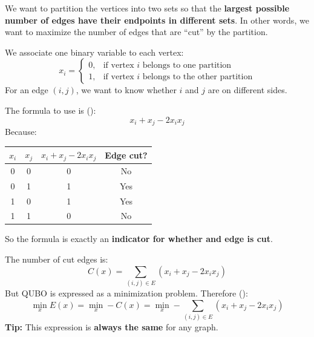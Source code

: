 \highspace
\begin{deepeningbox}
    We want to partition the vertices into two sets so that the \textbf{largest possible number of edges have their endpoints in different sets}. In other words, we want to maximize the number of edges that are ``cut'' by the partition.

    \highspace
    We associate one binary variable to each vertex:
    \begin{equation*}
        x_i =
        \begin{cases}
            0, & \text{if vertex $i$ belongs to one partition} \\
            1, & \text{if vertex $i$ belongs to the other partition}
        \end{cases}
    \end{equation*}
    For an edge $(i,j)$, we want to know whether $i$ and $j$ are on different sides.

    \highspace
    The formula to use is ():
    \begin{equation*}
        x_i + x_j - 2 x_i x_j
    \end{equation*}
    Because:
    \begin{center}
        \begin{tabular}{@{} c c c c @{}}
            \toprule
            $x_i$ & $x_j$ & $x_i + x_j - 2 x_i x_j$ & \textbf{Edge cut?} \\
            \midrule
            0 & 0 & 0 & No \\
            0 & 1 & 1 & Yes \\
            1 & 0 & 1 & Yes \\
            1 & 1 & 0 & No \\
            \bottomrule
        \end{tabular}
    \end{center}
    So the formula is exactly an \textbf{indicator for whether and edge is cut}.
\end{deepeningbox}

\highspace
{} The number of cut edges is:
\begin{equation*}
    C(x) = \sum_{(i, j) \in E} \left(x_i + x_j - 2 x_i x_j\right)
\end{equation*}
But QUBO is expressed as a minimization problem. Therefore ():
\begin{equation*}
    \boxed{\min_{x} E(x) = \min_{x} -C(x) = \min_{x} - \sum_{(i, j) \in E} \left(x_i + x_j - 2 x_i x_j\right)}
\end{equation*}
\textcolor{Green3}{ \textbf{Tip:}} This expression is \textbf{always the same} for any graph.

